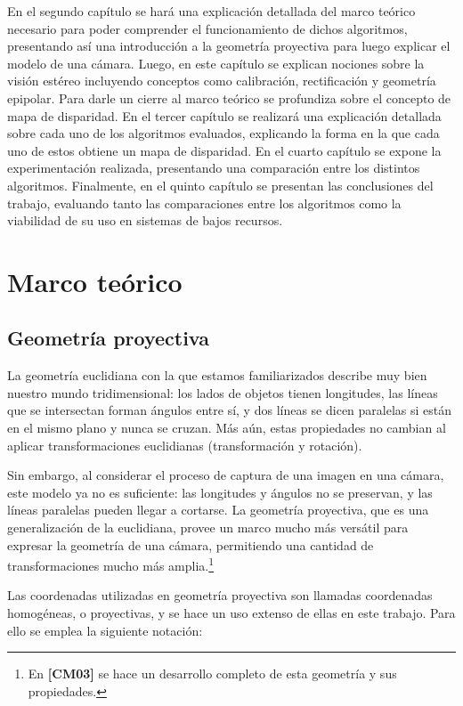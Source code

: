 \documentclass[11pt,a4paper,titlepage]{article}
\newcommand{\Cite}[1]{\textbf{[#1]}}
\begin{document}
En el segundo capítulo se hará una explicación detallada del marco teórico necesario para poder comprender el funcionamiento de dichos algoritmos, presentando así una introducción a la geometría proyectiva para luego explicar el modelo de una cámara. Luego, en este capítulo se explican nociones sobre la visión estéreo incluyendo conceptos como calibración, rectificación y geometría epipolar. Para darle un cierre al marco teórico se profundiza sobre el concepto de mapa de disparidad. En el tercer capítulo se realizará una explicación detallada sobre cada uno de los algoritmos evaluados, explicando la forma en la que cada uno de estos obtiene un mapa de disparidad. En el cuarto capítulo se expone la experimentación realizada, presentando una comparación entre los distintos algoritmos. Finalmente, en el quinto capítulo se presentan las conclusiones del trabajo, evaluando tanto las comparaciones entre los algoritmos como la viabilidad de su uso en sistemas de bajos recursos.

\newpage

\section{Marco teórico}

\subsection{Geometría proyectiva}

La geometría euclidiana con la que estamos familiarizados describe muy bien nuestro mundo tridimensional: los lados de objetos tienen longitudes, las líneas que se intersectan forman ángulos entre sí, y dos líneas se dicen paralelas si están en el mismo plano y nunca se cruzan. Más aún, estas propiedades no cambian al aplicar transformaciones euclidianas (transformación y rotación).

Sin embargo, al considerar el proceso de captura de una imagen en una cámara, este modelo ya no es suficiente: las longitudes y ángulos no se preservan, y las líneas paralelas pueden llegar a cortarse. La geometría proyectiva, que es una generalización de la euclidiana, provee un marco mucho más versátil para expresar la geometría de una cámara, permitiendo una cantidad de transformaciones mucho más amplia.\footnote{En \Cite{CM03} se hace un desarrollo completo de esta geometría y sus propiedades.}

Las coordenadas utilizadas en geometría proyectiva son llamadas coordenadas homogéneas, o proyectivas, y se hace un uso extenso de ellas en este trabajo. Para ello se emplea la siguiente notación:
\end{document}
